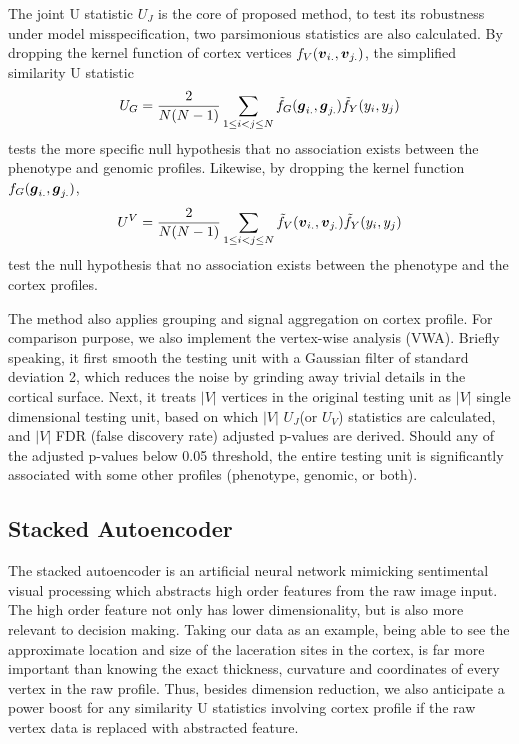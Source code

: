 The joint U statistic $U_J$ is the core of proposed method, to test its robustness under model misspecification, two parsimonious statistics are also calculated. By dropping the kernel function of cortex vertices $f_V(\boldsymbol{v}_{i.}, \boldsymbol{v}_{j.})$, the simplified similarity U statistic
\[ U_G = \frac{2}{N(N-1)} \sum_{1 \leq i < j \leq N}^{} \tilde{f}_G(\boldsymbol{g}_{i.}, \boldsymbol{g}_{j.}) \tilde{f}_Y(y_i, y_j) \]
tests the more specific null hypothesis that no association exists between the phenotype and genomic profiles. Likewise, by dropping the kernel function $f_G(\boldsymbol{g}_{i.}, \boldsymbol{g}_{j.})$, 
\[ U^V = \frac{2}{N(N-1)} \sum_{1 \leq i < j \leq N}^{} \tilde{f}_V(\boldsymbol{v}_{i.}, \boldsymbol{v}_{j.}) \tilde{f}_Y(y_i, y_j) \]
test the null hypothesis that no association exists between the phenotype and the cortex profiles.

The method also applies grouping and signal aggregation on cortex profile. For comparison purpose, we also implement the vertex-wise analysis (VWA). Briefly speaking, it first smooth the testing unit with a Gaussian filter of standard deviation 2, which reduces the noise by grinding away trivial details in the cortical surface. Next, it treats $|V|$ vertices in the original testing unit as $|V|$ single dimensional testing unit, based on which $|V|$ $U_J$(or $U_V$) statistics are calculated, and $|V|$ FDR (false discovery rate) adjusted p-values are derived. Should any of the adjusted p-values below 0.05 threshold, the entire testing unit is significantly associated with some other profiles (phenotype, genomic, or both).

\subsection{Stacked Autoencoder}
The stacked autoencoder is an artificial neural network mimicking sentimental visual processing which abstracts high order features from the raw image input. The high order feature not only has lower dimensionality, but is also more relevant to decision making. Taking our data as an example, being able to see the approximate location and size of the laceration sites in the cortex, is far more important than knowing the exact thickness, curvature and coordinates of every vertex in the raw profile. Thus, besides dimension reduction, we also anticipate a power boost for any similarity U statistics involving cortex profile if the raw vertex data is replaced with abstracted feature.

